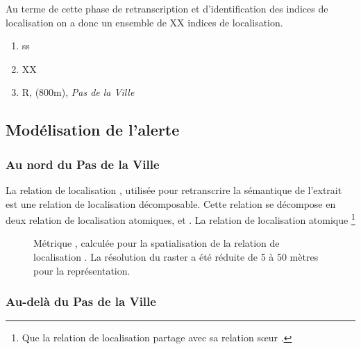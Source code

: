 %
Au terme de cette phase de retranscription et d'identification des
indices de localisation on a donc un ensemble de XX indices de
localisation.
%
\begin{enumerate}
\item ss
\item XX
\item R, (800m), \emph{Pas de la Ville}
\end{enumerate}


\subsection{Modélisation de l'alerte}
\label{subsec:9-2-2}




\subsubsection{Au nord du Pas de la Ville}

La relation de localisation ,
utilisée pour retranscrire la sémantique de l'extrait  est
une relation de localisation décomposable.
%
Cette relation se décompose en deux relation de localisation
atomiques,  et
. La relation de localisation
atomique  \footnote{Que la relation de
  localisation \protect{} partage avec
  sa relation sœur \protect{}.}


\begin{figure}
  \centering
  
  \caption{Métrique \protect{}, calculée
    pour la spatialisation de la relation de localisation
    \protect{}. La résolution du raster a
    été réduite de 5 à 50 mètres pour la représentation.}
  \label{fig:veyont_EcartNord}
\end{figure}


%   



\subsubsection{Au-delà du Pas de la Ville}

